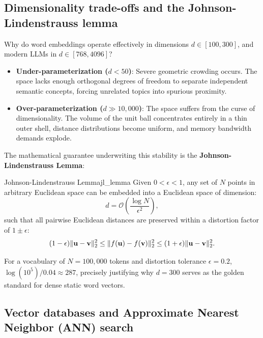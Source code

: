 \documentclass[../../main.tex]{subfiles}
\begin{document}
\subsection{Dimensionality trade-offs and the Johnson-Lindenstrauss lemma}
\label{subsec:johnson_lindenstrauss}

Why do word embeddings operate effectively in dimensions $d \in [100, 300]$, and modern LLMs in $d \in [768, 4096]$?
\begin{itemize}
    \item \textbf{Under-parameterization ($d < 50$)}: Severe geometric crowding occurs. The space lacks enough orthogonal degrees of freedom to separate independent semantic concepts, forcing unrelated topics into spurious proximity.
    \item \textbf{Over-parameterization ($d \gg 10{,}000$)}: The space suffers from the curse of dimensionality. The volume of the unit ball concentrates entirely in a thin outer shell, distance distributions become uniform, and memory bandwidth demands explode.
\end{itemize}

The mathematical guarantee underwriting this stability is the \textbf{Johnson-Lindenstrauss Lemma}:
\begin{theorem}{Johnson-Lindenstrauss Lemma}{jl_lemma}
Given $0 < \epsilon < 1$, any set of $N$ points in arbitrary Euclidean space can be embedded into a Euclidean space of dimension:
\begin{equation}
\label{eq:jl_dimension}
d = \mathcal{O}\left( \frac{\log N}{\epsilon^2} \right),
\end{equation}
such that all pairwise Euclidean distances are preserved within a distortion factor of $1 \pm \epsilon$:
\begin{equation}
\label{eq:jl_bound}
(1 - \epsilon) \|\mathbf{u} - \mathbf{v}\|_2^2 \le \|f(\mathbf{u}) - f(\mathbf{v})\|_2^2 \le (1 + \epsilon) \|\mathbf{u} - \mathbf{v}\|_2^2.
\end{equation}
\end{theorem}
For a vocabulary of $N = 100{,}000$ tokens and distortion tolerance $\epsilon = 0.2$, $\log(10^5) / 0.04 \approx 287$, precisely justifying why $d = 300$ serves as the golden standard for dense static word vectors.

\subsection{Vector databases and Approximate Nearest Neighbor (ANN) search}
\label{subsec:vector_databases}
\end{document}
